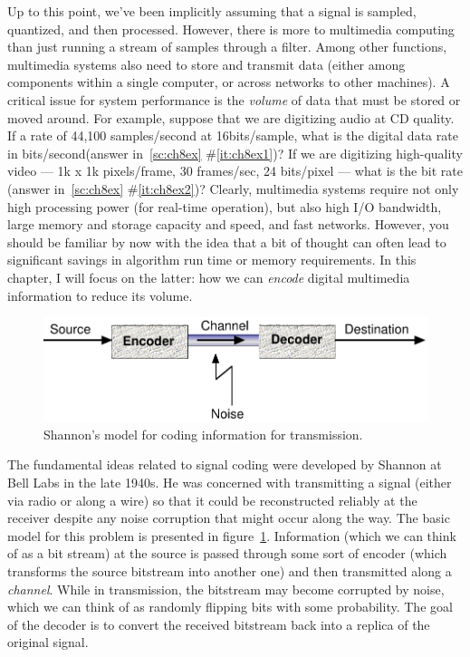 Up to this point, we've been implicitly assuming that a signal is
sampled, quantized, and then processed.  However, there is more to
multimedia computing than just running a stream of samples through a
filter.  Among other functions, multimedia systems also need to store
and transmit data (either among components within a single computer,
or across networks to other machines).  A critical issue for system
performance is the \emph{volume} of data that must be stored or moved
around. For example, suppose that we are digitizing audio at CD
quality. If a rate of 44,100 samples/second at 16bits/sample, what is
the digital data rate in bits/second(answer in~\ref{sc:ch8ex}
\#\ref{it:ch8ex1})?
If we are digitizing high-quality video --- 1k x 1k
pixels/frame, 30 frames/sec, 24 bits/pixel --- what is the bit
rate (answer in~\ref{sc:ch8ex}
\#\ref{it:ch8ex2})?
Clearly, multimedia systems require not only high processing power
(for real-time operation), but also high I/O bandwidth, large memory
and storage capacity and speed, and fast networks. However, you should
be familiar by now with the idea that a bit of thought can often lead
to significant savings in algorithm run time or memory
requirements. In this chapter, I will focus on the latter: how we can
\emph{encode} digital multimedia information to reduce its volume.

\begin{figure}
\centerline{\includegraphics[width=\textwidth]{ch-comp/shannon}}
\caption{Shannon's model for coding information for
  transmission.\label{fg:shannon}}
\end{figure}

The fundamental ideas related to signal coding were developed by
Shannon at Bell Labs in the late 1940s. He was concerned with
transmitting a signal (either via radio or along a wire) so that it
could be reconstructed reliably at the receiver despite any noise
corruption that might occur along the way. The basic model for this
problem is presented in figure~\ref{fg:shannon}. Information (which we
can think of as a bit stream) at the source is passed through some
sort of encoder (which transforms the source bitstream into another
one) and then transmitted along a \emph{channel}. While in
transmission, the bitstream may become corrupted by noise, which we
can think of as randomly flipping bits with some probability. The goal
of the decoder is to convert the received bitstream back into a
replica of the original signal.


